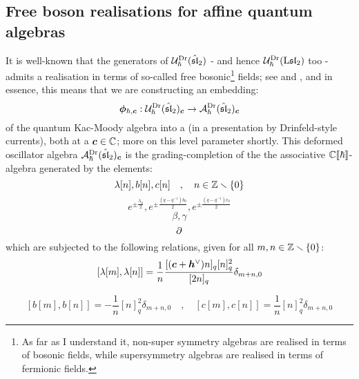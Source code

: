         \subsection{Free boson realisations for affine quantum algebras}
            It is well-known that the generators of $\mathcal{U}_{\hbar}^{\mathrm{Dr}}(\hat{\mathfrak{sl}}_2)$ - and hence $\mathcal{U}_{\hbar}^{\mathrm{Dr}}(\mathrm{L} \mathfrak{sl}_2)$ too - admits a realisation in terms of so-called free bosonic\footnote{As far as I understand it, non-super symmetry algebras are realised in terms of bosonic fields, while supersymmetry algebras are realised in terms of fermionic fields.} fields; see \cite{awata_odake_shiraishi_free_boson_realisation_of_quantum_affine_sl_N} and \cite[Section 7]{frenkel_reshetikhin_affine_QUEs_and_deformed_virasoro_and_finite_W_algebras}, and in essence, this means that we are constructing an embedding:
                $$\boldsymbol{\phi}_{\hbar, \boldsymbol{c}}: \mathcal{U}_{\hbar}^{\mathrm{Dr}}(\hat{\mathfrak{sl}}_2)_{\boldsymbol{c}} \to \mathcal{A}_{\hbar}^{\mathrm{Dr}}(\hat{\mathfrak{sl}}_2)_{\boldsymbol{c}}$$
            of the quantum Kac-Moody algebra into a  (in a presentation by Drinfeld-style currents), both at a  $\boldsymbol{c} \in \mathbb{C}$; more on this level parameter shortly. This deformed oscillator algebra $\mathcal{A}_{\hbar}^{\mathrm{Dr}}(\hat{\mathfrak{sl}}_2)_{\boldsymbol{c}}$ is the grading-completion of the the associative $\mathbb{C}[\![\hbar]\!]$-algebra generated by the elements:
                $$\lambda[n], b[n], c[n] \quad, \quad n \in \mathbb{Z} \smallsetminus \{0\}$$
                $$e^{\pm \frac{\lambda_0}{2}}, e^{\pm \frac{(q - q^{-1}) b_0}{2}}, e^{\pm \frac{(q - q^{-1}) c_0}{2}}$$
                $$\beta, \gamma$$
                $$\partial$$
            which are subjected to the following relations, given for all $m, n \in \mathbb{Z} \smallsetminus \{0\}$:
                \begin{equation} \label{equation: q_deformed_affine_sl_2_oscillator_lambda_commutators}
                    [ \lambda[m], \lambda[n] ] = \frac1n \frac{ [(\boldsymbol{c} + \boldsymbol{h}^{\vee}) n]_q [n]_q^2 }{ [2n]_q } \delta_{m + n, 0}
                \end{equation}
                
                \begin{equation} \label{equation: q_deformed_affine_sl_2_oscillator_bc_commutators}
                    [ b[m], b[n] ] = -\frac1n [n]_q^2 \delta_{m + n, 0} \quad, \quad [ c[m], c[n] ] = \frac1n [n]_q^2 \delta_{m + n, 0}
                \end{equation}
                
